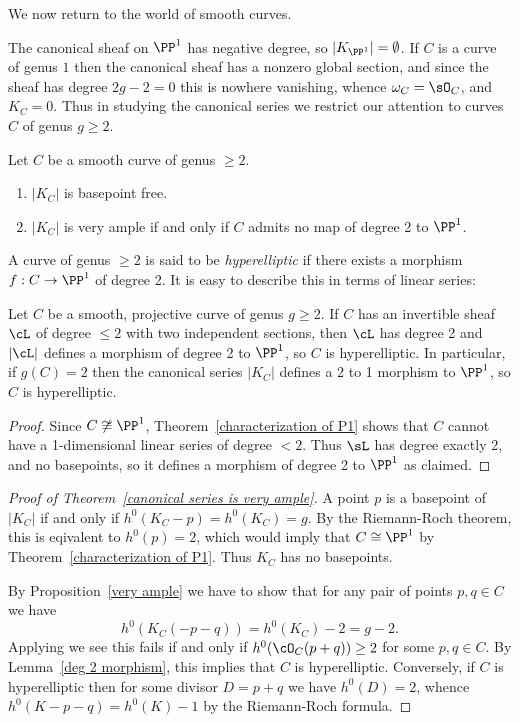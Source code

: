 We now return to the world of smooth curves.

 The canonical sheaf on $\PP^1$ has negative degree, so $|K_{\PP^1}| = \emptyset$. If $C$ is a curve
 of genus $1$ then the canonical sheaf     has a nonzero global section, and since the sheaf has degree $2g-2=0$ this is nowhere vanishing, whence
 $\omega_C = \sO_C$, and $K_C = 0$. Thus in studying the canonical series we restrict our attention to curves $C$ of genus $g\geq 2$. 
 
 \begin{theorem}\label{canonical series is very ample} Let $C$ be a smooth curve of genus $\geq 2$.
\begin{enumerate}
 \item $|K_C|$ is basepoint free.
 \item $|K_C|$ is very ample if and only if $C$ admits no map of degree 2 to $\PP^1$.
\end{enumerate}
\end{theorem}

A curve of genus $\geq 2$
is said to be \emph{hyperelliptic} if there exists a morphism $f: C \to \PP^1$ of degree 2. 
It is easy to describe this in terms of linear series:

\begin{lemma}\label{deg 2 morphism}
Let $C$ be a smooth, projective curve of genus $g\geq 2$. If $C$ has an invertible sheaf $\cL$ of degree $\leq 2$ with two independent sections, then $\cL$ has degree 2 and
$|\cL|$ defines a morphism of degree 2 to $\PP^{1}$, so $C$ is hyperelliptic. In particular, if $g(C) = 2$ then the canonical series $|K_{C}|$ defines a 2 to 1 morphism to $\PP^{1}$, so $C$ is hyperelliptic.
\end{lemma}

\begin{proof}
Since $C \not\cong \PP^1$,  Theorem~\ref{characterization of P1} shows that $C$ cannot have a 1-dimensional linear series
of degree $< 2$. Thus $\sL$ has degree exactly 2, and no basepoints, so it defines a morphism of degree 2 to $\PP^1$ as claimed.
\end{proof}

\begin{proof}[Proof of Theorem~\ref{canonical series is very ample}]
A point $p$ is a basepoint of $|K_C|$ if and only if $h^0(K_C-p) = h^0(K_C) = g$. By the Riemann-Roch theorem,
this is eqivalent to $h^0(p) =2$, which would imply that $C\cong \PP^1$ by Theorem~\ref{characterization of P1}. Thus $K_C$
has no basepoints.

By Proposition~\ref{very ample} we have to show that for any pair of points $p, q \in C$ we have
$$
h^0(K_C(-p-q)) = h^0(K_C)-2 = g-2.
$$
Applying \trr we see this fails if and only if $h^0(\cO_C(p+q)) \geq 2$ for some $p,q \in C$. By Lemma~\ref{deg 2 morphism}, this implies that $C$ is hyperelliptic. Conversely, if $C$ is hyperelliptic then for some divisor $D = p+q$ we have $h^0(D) = 2$, whence $h^0(K-p-q) = h^0(K) -1$ by
the Riemann-Roch formula.
\end{proof}

